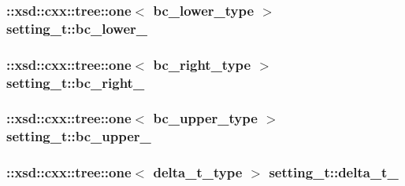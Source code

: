 \subsubsection[{\texorpdfstring{bc\+\_\+lower\+\_\+}{bc_lower_}}]{\setlength{\rightskip}{0pt plus 5cm}\+::xsd\+::cxx\+::tree\+::one$<$ {\bf bc\+\_\+lower\+\_\+type} $>$ setting\+\_\+t\+::bc\+\_\+lower\+\_\+\hspace{0.3cm}{\ttfamily [protected]}}\hypertarget{classsetting__t_af62d9775e1c9cd1be682bb44ea928659}{}\label{classsetting__t_af62d9775e1c9cd1be682bb44ea928659}
\subsubsection[{\texorpdfstring{bc\+\_\+right\+\_\+}{bc_right_}}]{\setlength{\rightskip}{0pt plus 5cm}\+::xsd\+::cxx\+::tree\+::one$<$ {\bf bc\+\_\+right\+\_\+type} $>$ setting\+\_\+t\+::bc\+\_\+right\+\_\+\hspace{0.3cm}{\ttfamily [protected]}}\hypertarget{classsetting__t_ae5be1f5dc1c738e1c26fa59daadd3423}{}\label{classsetting__t_ae5be1f5dc1c738e1c26fa59daadd3423}
\subsubsection[{\texorpdfstring{bc\+\_\+upper\+\_\+}{bc_upper_}}]{\setlength{\rightskip}{0pt plus 5cm}\+::xsd\+::cxx\+::tree\+::one$<$ {\bf bc\+\_\+upper\+\_\+type} $>$ setting\+\_\+t\+::bc\+\_\+upper\+\_\+\hspace{0.3cm}{\ttfamily [protected]}}\hypertarget{classsetting__t_a5819a5b67fe3860415c38c8ce232ddd8}{}\label{classsetting__t_a5819a5b67fe3860415c38c8ce232ddd8}
\subsubsection[{\texorpdfstring{delta\+\_\+t\+\_\+}{delta_t_}}]{\setlength{\rightskip}{0pt plus 5cm}\+::xsd\+::cxx\+::tree\+::one$<$ {\bf delta\+\_\+t\+\_\+type} $>$ setting\+\_\+t\+::delta\+\_\+t\+\_\+\hspace{0.3cm}{\ttfamily [protected]}}\hypertarget{classsetting__t_aa3a9ca5e9fac7f5071d10188a07fc82d}{}\label{classsetting__t_aa3a9ca5e9fac7f5071d10188a07fc82d}
